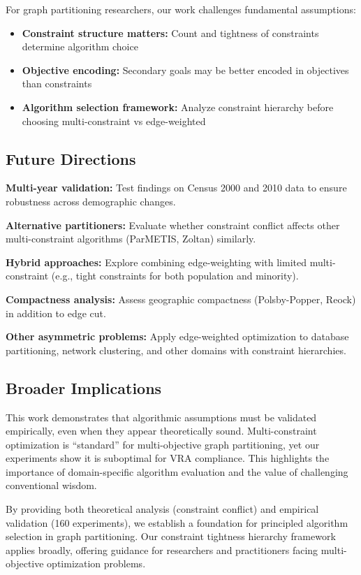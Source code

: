 For graph partitioning researchers, our work challenges fundamental assumptions:
\begin{itemize}
    \item \textbf{Constraint structure matters:} Count and tightness of constraints determine algorithm choice
    \item \textbf{Objective encoding:} Secondary goals may be better encoded in objectives than constraints
    \item \textbf{Algorithm selection framework:} Analyze constraint hierarchy before choosing multi-constraint vs edge-weighted
\end{itemize}

\subsection{Future Directions}

\textbf{Multi-year validation:} Test findings on Census 2000 and 2010 data to ensure robustness across demographic changes.

\textbf{Alternative partitioners:} Evaluate whether constraint conflict affects other multi-constraint algorithms (ParMETIS, Zoltan) similarly.

\textbf{Hybrid approaches:} Explore combining edge-weighting with limited multi-constraint (e.g., tight constraints for both population and minority).

\textbf{Compactness analysis:} Assess geographic compactness (Polsby-Popper, Reock) in addition to edge cut.

\textbf{Other asymmetric problems:} Apply edge-weighted optimization to database partitioning, network clustering, and other domains with constraint hierarchies.

\subsection{Broader Implications}

This work demonstrates that algorithmic assumptions must be validated empirically, even when they appear theoretically sound. Multi-constraint optimization is ``standard'' for multi-objective graph partitioning, yet our experiments show it is suboptimal for VRA compliance. This highlights the importance of domain-specific algorithm evaluation and the value of challenging conventional wisdom.

By providing both theoretical analysis (constraint conflict) and empirical validation (160 experiments), we establish a foundation for principled algorithm selection in graph partitioning. Our constraint tightness hierarchy framework applies broadly, offering guidance for researchers and practitioners facing multi-objective optimization problems.


